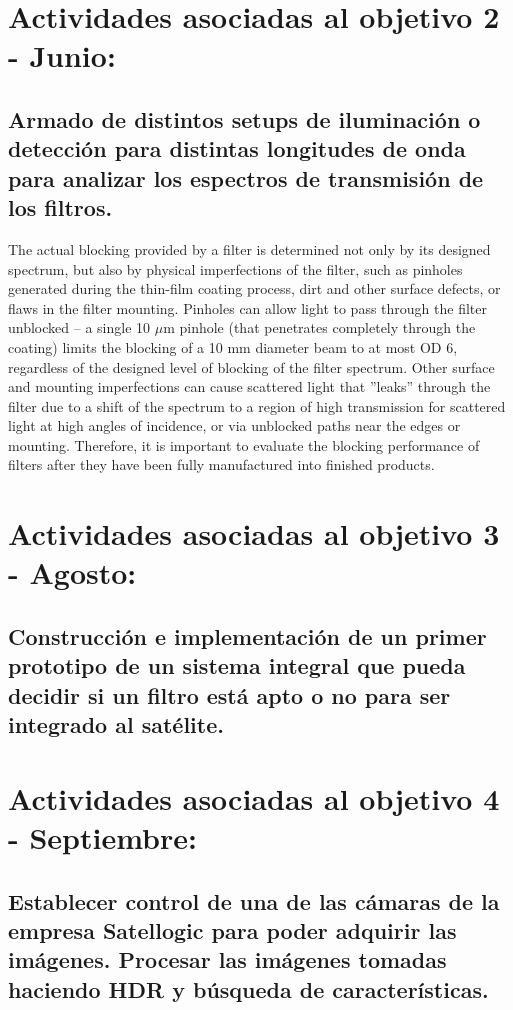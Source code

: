 \documentclass{ctuthesis}
\begin{document}
\section*{Actividades asociadas al objetivo 2 - Junio:}
\subsection*{Armado de distintos setups de iluminación 
	o detección para distintas longitudes de onda para analizar los espectros 
	de transmisión de los filtros.}

The actual blocking provided by a filter is determined not only by its designed 
spectrum, but
also by physical imperfections of the filter, such as pinholes generated during 
the thin-film
coating process, dirt and other surface defects, or flaws in the filter 
mounting. Pinholes can
allow light to pass through the filter unblocked – a single 10 $\mu$m pinhole 
(that 
penetrates
completely through the coating) limits the blocking of a 10 mm diameter beam to 
at most OD 6,
regardless of the designed level of blocking of the filter spectrum. Other 
surface and mounting
imperfections can cause scattered light that ''leaks'' through the filter due 
to 
a shift of the
spectrum to a region of high transmission for scattered light at high angles of 
incidence, or via unblocked paths near the edges or mounting. Therefore, it is 
important to evaluate the blocking
performance of filters after they have been fully manufactured into finished 
products.
\section*{Actividades asociadas al objetivo 3 - Agosto:}
\subsection*{Construcción e implementación de un primer prototipo de un sistema 
integral que pueda decidir si un filtro está apto o no para ser integrado al 
satélite.}


\section*{Actividades asociadas al objetivo 4 - Septiembre:}
\subsection*{Establecer control de una de las cámaras de la empresa Satellogic 
para poder adquirir las
	imágenes. Procesar las imágenes tomadas haciendo HDR y búsqueda de 
	características.}
\end{document}
